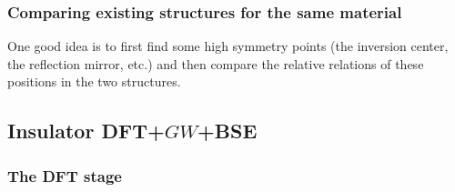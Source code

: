 \documentclass[hyperref, a4paper, 12pt]{report}
\begin{document}
\subsubsection{Comparing existing structures for the same material}

One good idea is to first find some high symmetry points 
(the inversion center, the reflection mirror, etc.) 
and then compare the relative relations of these positions 
in the two structures.

\subsection{Insulator DFT+$GW$+BSE}

\subsubsection{The DFT stage}
\end{document}

